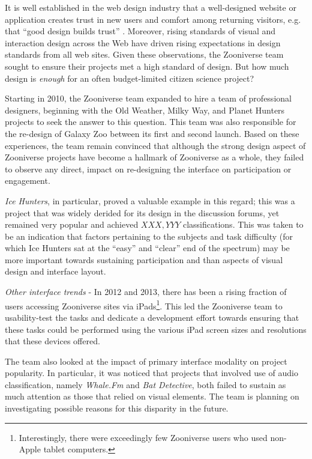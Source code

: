 \documentclass{sigchi}
\begin{document}
It is well established in the web design industry that a well-designed website or application creates trust in new users and comfort among returning visitors, e.g. that ``good design builds trust'' \cite{someone}.  Moreover, rising standards of visual and interaction design across the Web have driven rising expectations in design standards from all web sites.  Given these observations, the Zooniverse team sought to ensure their projects met a high standard of design.  But how much design is \emph{enough} for an often budget-limited citizen science project?  

Starting in 2010, the Zooniverse team expanded to hire a team of professional designers, beginning with the Old Weather, Milky Way, and Planet Hunters projects to seek the answer to this question.  This team was also responsible for the re-design of Galaxy Zoo between its first and second launch.  Based on these experiences, the team remain convinced that although the strong design aspect of Zooniverse projects have become a hallmark of Zooniverse as a whole, they failed to observe any direct, impact on re-designing the interface on participation or engagement.  

\emph{Ice Hunters}, in particular, proved a valuable example in this regard; this was a project that was widely derided for its design in the discussion forums, yet remained very popular and achieved $XXX,YYY$ classifications.  This was taken to be an indication that factors pertaining to the subjects and task difficulty (for which Ice Hunters sat at the ``easy'' and ``clear'' end of the spectrum) may be more important towards sustaining participation and than aspects of visual design and interface layout.

\emph{Other interface trends} - 
In 2012 and 2013, there has been a rising fraction of users accessing Zooniverse sites via iPads\footnote{Interestingly, there were exceedingly few Zooniverse users who used non-Apple tablet computers.}. This led the Zooniverse team to usability-test the tasks and dedicate a development effort towards ensuring that these tasks could be performed using the various iPad screen sizes and resolutions that these devices offered. 

The team also looked at the impact of primary interface modality on project popularity.  In particular, it was noticed that projects that involved use of audio classification, namely \emph{Whale.Fm} and \emph{Bat Detective}, both failed to sustain as much attention as those that relied on visual elements.  The team is planning on investigating possible reasons for this disparity in the future.
\end{document}
